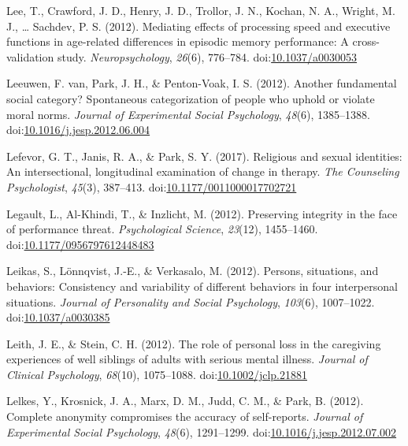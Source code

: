 \documentclass[english,man]{apa6}
\theoremstyle{definition}
\theoremstyle{definition}
\theoremstyle{definition}
\theoremstyle{remark}
\begin{document}
\hypertarget{ref-Lee2012a}{}
Lee, T., Crawford, J. D., Henry, J. D., Trollor, J. N., Kochan, N. A.,
Wright, M. J., \ldots{} Sachdev, P. S. (2012). Mediating effects of
processing speed and executive functions in age-related differences in
episodic memory performance: A cross-validation study.
\emph{Neuropsychology}, \emph{26}(6), 776--784.
doi:\href{https://doi.org/10.1037/a0030053}{10.1037/a0030053}

\hypertarget{ref-VanLeeuwen2012}{}
Leeuwen, F. van, Park, J. H., \& Penton-Voak, I. S. (2012). Another
fundamental social category? Spontaneous categorization of people who
uphold or violate moral norms. \emph{Journal of Experimental Social
Psychology}, \emph{48}(6), 1385--1388.
doi:\href{https://doi.org/10.1016/j.jesp.2012.06.004}{10.1016/j.jesp.2012.06.004}

\hypertarget{ref-Lefevor2017}{}
Lefevor, G. T., Janis, R. A., \& Park, S. Y. (2017). Religious and
sexual identities: An intersectional, longitudinal examination of change
in therapy. \emph{The Counseling Psychologist}, \emph{45}(3), 387--413.
doi:\href{https://doi.org/10.1177/0011000017702721}{10.1177/0011000017702721}

\hypertarget{ref-Legault2012}{}
Legault, L., Al-Khindi, T., \& Inzlicht, M. (2012). Preserving integrity
in the face of performance threat. \emph{Psychological Science},
\emph{23}(12), 1455--1460.
doi:\href{https://doi.org/10.1177/0956797612448483}{10.1177/0956797612448483}

\hypertarget{ref-Leikas2012}{}
Leikas, S., Lönnqvist, J.-E., \& Verkasalo, M. (2012). Persons,
situations, and behaviors: Consistency and variability of different
behaviors in four interpersonal situations. \emph{Journal of Personality
and Social Psychology}, \emph{103}(6), 1007--1022.
doi:\href{https://doi.org/10.1037/a0030385}{10.1037/a0030385}

\hypertarget{ref-Leith2012}{}
Leith, J. E., \& Stein, C. H. (2012). The role of personal loss in the
caregiving experiences of well siblings of adults with serious mental
illness. \emph{Journal of Clinical Psychology}, \emph{68}(10),
1075--1088.
doi:\href{https://doi.org/10.1002/jclp.21881}{10.1002/jclp.21881}

\hypertarget{ref-Lelkes2012}{}
Lelkes, Y., Krosnick, J. A., Marx, D. M., Judd, C. M., \& Park, B.
(2012). Complete anonymity compromises the accuracy of self-reports.
\emph{Journal of Experimental Social Psychology}, \emph{48}(6),
1291--1299.
doi:\href{https://doi.org/10.1016/j.jesp.2012.07.002}{10.1016/j.jesp.2012.07.002}
\end{document}
